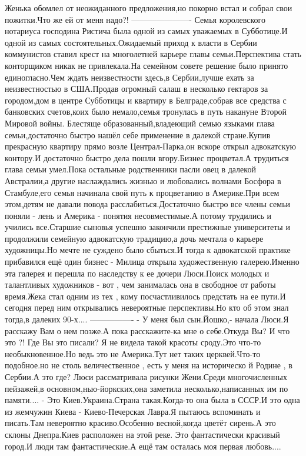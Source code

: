 Женька обомлел от неожиданного предложения,но покорно встал и собрал свои пожитки.Что же ей от меня надо?!
———————-
Семья королевского нотариуса господина Ристича была одной из самых уважаемых в Субботице.И одной из самых состоятельных.Ожидаемый приход к власти в Сербии коммунистов ставил крест на многолетней карьере главы семьи.Перспектива стать конторщиком никак не привлекала.На семейном совете решение было принято единогласно.Чем ждать неизвестности здесь,в Сербии,лучше ехать за неизвестностью в США.Продав огромный салаш в несколько гектаров за городом,дом в центре Субботицы и квартиру в Белграде,собрав все средства с банковских счетов,коих было немало,семья тронулась в путь накануне Второй Мировой войны.
Блестяще образованный,владеющий семью языками глава семьи,достаточно быстро нашёл себе применение в далекой стране.Купив прекрасную квартиру прямо возле Централ-Парка,он вскоре открыл адвокатскую контору.И достаточно быстро дела пошли вгору.Бизнес процветал.А трудиться глава семьи умел.Пока остальные родственники пасли овец в далекой Австралии,а другие наслаждались жизнью и любовались волнами  Босфора в Стамбуле,его семья начинала свой путь к процветанию в Америке.При всем этом,детям не давали повода расслабиться.Достаточно быстро все члены семьи поняли - лень и Америка - понятия несовместимые.А потому трудились и учились все.Старшие сыновья успешно закончили престижные университеты и продолжили семейную адвокатскую традицию,а дочь мечтала о карьере художницы.Но мечте не суждено было сбыться.И тогда к адвокатской практике прибавился ещё один бизнес - Милица открыла художественную галерею.Именно эта галерея и перешла по наследству к ее дочери Люси.Поиск молодых и талантливых художников - вот , чем занималась она в свободное от работы время.Жека стал одним из тех , кому посчастливилось предстать на ее пути.И сегодня перед ним открывались невероятные перспективы.Но кто об этом знал тогда,в далеких 90-х....
—————-
- У меня был сын.Йошко,- начала Люси.Я расскажу Вам о нем позже.А пока расскажите-ка мне о себе.Откуда Вы? И что это ?! Где Вы это писали? Я не видела такой красоты сроду.Это что-то необыкновенное.Но ведь это не Америка.Тут нет таких церквей.Что-то подобное.но не столь величественное , есть у меня на историческо й Родине , в Сербии.А это где?
Люси рассматривала рисунки Жени.Среди многочисленных пейзажей,в основном,нью-йоркских,она заметила несколько,написанных им по памяти....
- Это Киев.Украина.Страна такая.Когда-то она была в СССР.И это одна из жемчужин Киева - Киево-Печерская Лавра.Я пытаюсь вспоминать и писать.Там невероятно красиво.Особенно весной,когда цветёт сирень.А это склоны Днепра.Киев расположен на этой реке. Это фантастически красивый город.И люди там фантастические.А ещё там осталась моя первая любовь.... 
